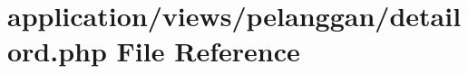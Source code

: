 \hypertarget{detailord_8php}{}\section{application/views/pelanggan/detailord.php File Reference}
\label{detailord_8php}
